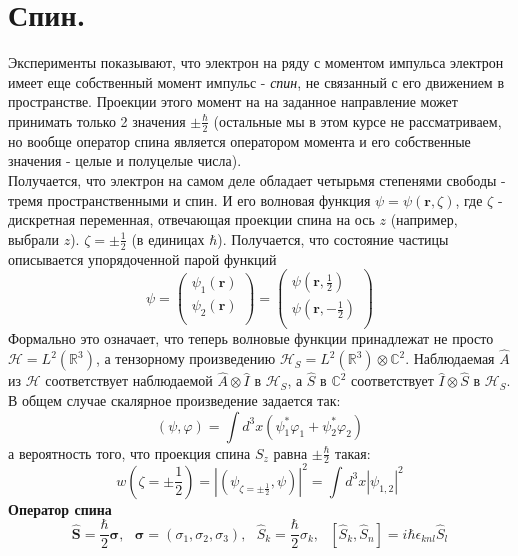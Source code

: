 \section{Спин.}
	Эксперименты показывают, что электрон на ряду с моментом импульса электрон имеет еще собственный момент импульс - \textit{спин}, не связанный с его движением в пространстве. Проекции этого момент на на заданное направление может принимать только 2 значения $\pm\frac{\hbar}{2}$ (остальные мы в этом курсе не рассматриваем, но вообще оператор спина является оператором момента и его собственные значения - целые и полуцелые числа). \\
	Получается, что электрон на самом деле обладает четырьмя степенями свободы - тремя пространственными и спин. И его волновая функция $\psi = \psi(\textbf{r}, \zeta)$, где $\zeta$ - дискретная переменная, отвечающая проекции спина на ось $z$ (например, выбрали $z$). $\zeta=\pm\frac{1}{2}$ (в единицах $\hbar$). Получается, что состояние частицы описывается упорядоченной парой функций
	$$
		\psi = \left( 
		\begin{array}{c}
			\psi_1(\textbf{r}) \\
			\psi_2(\textbf{r}) \\
		\end{array} 
		\right) = \left( 
		\begin{array}{c}
			\psi(\textbf{r}, \frac{1}{2}) \\
			\psi(\textbf{r}, -\frac{1}{2}) \\
		\end{array} \right) 
	$$
	Формально это означает, что теперь волновые функции принадлежат не просто $\mathcal{H}=L^2(\mathbb{R}^3)$, а тензорному произведению $\mathcal{H}_S = L^2(\mathbb{R}^3)\otimes\mathbb{C}^2$. Наблюдаемая $\hat{A}$ из $\mathcal{H}$ соответствует наблюдаемой $\hat{A}\otimes\hat{I}$ в $\mathcal{H}_S$, а $\hat{S}$ в $\mathbb{C}^2$ соответствует $\hat{I}\otimes\hat{S}$ в $\mathcal{H}_S$. В общем случае скалярное произведение задается так: 
	$$
		(\psi,\varphi) = \int d^3x (\psi_1^{*}\varphi_1 + \psi_2^{*}\varphi_2)
	$$
	а вероятность того, что проекция спина $S_z$ равна $\pm\frac{\hbar}{2}$ такая:
	$$
		w\left(\zeta = \pm\frac{1}{2}\right) = |(\psi_{\zeta=\pm\frac{1}{2}},\psi)|^2 = \int d^3x |\psi_{1,2}|^2
	$$
	\noindent\textbf{Оператор спина}\\
	$$	
		\hat{\textbf{S}} = \frac{\hbar}{2}\bm{\sigma}, \ \ \ \bm{\sigma} = (\sigma_1,\sigma_2,\sigma_3), \ \ \ \hat{S}_k = \frac{\hbar}{2}\sigma_k, \ \ \ [\hat{S}_k, \hat{S}_n] = i\hbar\epsilon_{knl}\hat{S}_l
	$$
